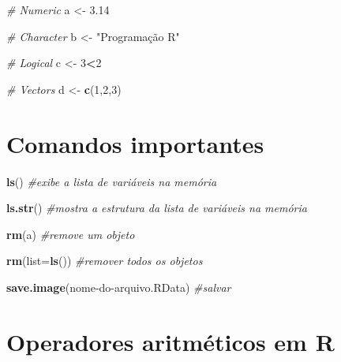 \documentclass[
]{book}
\newenvironment{Shaded}{\begin{snugshade}}{\end{snugshade}}
\newcommand{\AttributeTok}[1]{\textcolor[rgb]{0.13,0.29,0.53}{#1}}
\newcommand{\CommentTok}[1]{\textcolor[rgb]{0.56,0.35,0.01}{\textit{#1}}}
\newcommand{\DecValTok}[1]{\textcolor[rgb]{0.00,0.00,0.81}{#1}}
\newcommand{\FloatTok}[1]{\textcolor[rgb]{0.00,0.00,0.81}{#1}}
\newcommand{\FunctionTok}[1]{\textcolor[rgb]{0.13,0.29,0.53}{\textbf{#1}}}
\newcommand{\NormalTok}[1]{#1}
\newcommand{\OtherTok}[1]{\textcolor[rgb]{0.56,0.35,0.01}{#1}}
\newcommand{\SpecialCharTok}[1]{\textcolor[rgb]{0.81,0.36,0.00}{\textbf{#1}}}
\newcommand{\StringTok}[1]{\textcolor[rgb]{0.31,0.60,0.02}{#1}}
\theoremstyle{definition}
\theoremstyle{definition}
\theoremstyle{definition}
\theoremstyle{definition}
\theoremstyle{remark}
\begin{document}
\begin{Shaded}
\begin{Highlighting}[]
\CommentTok{\# Numeric}
\NormalTok{a }\OtherTok{\textless{}{-}} \FloatTok{3.14}

\CommentTok{\# Character}
\NormalTok{b }\OtherTok{\textless{}{-}} \StringTok{"Programação R"}

\CommentTok{\# Logical}
\NormalTok{c }\OtherTok{\textless{}{-}} \DecValTok{3}\SpecialCharTok{\textless{}}\DecValTok{2}

\CommentTok{\# Vectors}
\NormalTok{d }\OtherTok{\textless{}{-}} \FunctionTok{c}\NormalTok{(}\DecValTok{1}\NormalTok{,}\DecValTok{2}\NormalTok{,}\DecValTok{3}\NormalTok{)}
\end{Highlighting}
\end{Shaded}

\section{Comandos importantes}\label{comandos-importantes}

\begin{Shaded}
\begin{Highlighting}[]
\FunctionTok{ls}\NormalTok{() }\CommentTok{\#exibe a lista de variáveis na memória}
    
\FunctionTok{ls.str}\NormalTok{() }\CommentTok{\#mostra a estrutura da lista de variáveis na memória}
    
\FunctionTok{rm}\NormalTok{(a) }\CommentTok{\#remove um objeto}
    
\FunctionTok{rm}\NormalTok{(}\AttributeTok{list=}\FunctionTok{ls}\NormalTok{()) }\CommentTok{\#remover todos os objetos}
    
\FunctionTok{save.image}\NormalTok{(}\StringTok{\textquotesingle{}nome{-}do{-}arquivo.RData\textquotesingle{}}\NormalTok{) }\CommentTok{\#salvar}
\end{Highlighting}
\end{Shaded}

\section{Operadores aritméticos em R}\label{operadores-aritmuxe9ticos-em-r}
\end{document}
